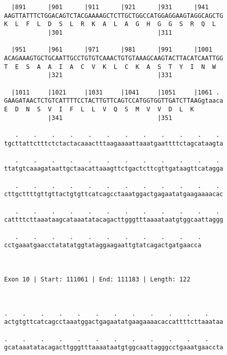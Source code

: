 \documentclass{article}
\begin{document}
\begin{Verbatim}
  |891      |901      |911      |921      |931      |941    
AAGTTATTTCTGGACAGTCTACGAAAAGCTCTTGCTGGCCATGGAGGAAGTAGGCAGCTG
K  L  F  L  D  S  L  R  K  A  L  A  G  H  G  G  S  R  Q  L  
            |301                          |311              
  
  |951      |961      |971      |981      |991      |1001   
ACAGAAAGTGCTGCAATTGCCTGTGTCAAACTGTGTAAAGCAAGTACTTACATCAATTGG
T  E  S  A  A  I  A  C  V  K  L  C  K  A  S  T  Y  I  N  W  
            |321                          |331              
  
  |1011     |1021     |1031     |1041     |1051     |1061 . 
GAAGATAACTCTGTCATTTTCCTACTTGTTCAGTCCATGGTGGTTGATCTTAAGgtaaca
E  D  N  S  V  I  F  L  L  V  Q  S  M  V  V  D  L  K        
            |341                          |351              
  
   .    .    .    .    .    .    .    .    .    .    .    . 
tgcttattctttctctactacaaactttaagaaaattaaatgaattttctagcataagta
                                                            
   .    .    .    .    .    .    .    .    .    .    .    . 
ttatgtcaaagataattgctaacattaaagttctgactcttcgttgataagttcatagga
                                                            
   .    .    .    .    .    .    .    .    .    .    .    . 
cttgcttttgttgttactgtgttcatcagcctaaatggactgagaatatgaagaaaacac
                                                            
   .    .    .    .    .    .    .    .    .    .    .    . 
cattttcttaaataagcataaatatacagacttgggtttaaaataatgtggcaattaggg
                                                            
   .    .    .    .    .    .    .    .    .    .    .
cctgaaatgaacctatatatggtataggaagaattgtatcagactgatgaacca
                                                      
                                                      
 
Exon 10 | Start: 111061 | End: 111183 | Length: 122



.    .    .    .    .    .    .    .    .    .    .    .    
actgtgttcatcagcctaaatggactgagaatatgaagaaaacaccattttcttaaataa
                                                            
.    .    .    .    .    .    .    .    .    .    .    .    
gcataaatatacagacttgggtttaaaataatgtggcaattagggcctgaaatgaaccta
                                                            

\end{Verbatim}
\end{document}
